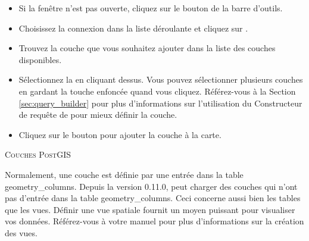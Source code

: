 \begin{itemize}[label=--]
\item Si la fenêtre  n'est pas ouverte, cliquez sur le bouton  de la barre d'outils.
\item Choisissez la connexion dans la liste déroulante et cliquez sur .
\item Trouvez la couche que vous souhaitez ajouter dans la liste des couches disponibles.
\item Sélectionnez la en cliquant dessus. Vous pouvez sélectionner plusieurs couches en gardant la touche  enfoncée quand vous cliquez. Référez-vous à la Section \ref{sec:query_builder} pour plus d'informations sur l'utilisation du Constructeur de requête de \psq pour mieux définir la couche.
\item Cliquez sur le bouton  pour ajouter la couche à la carte.
\end{itemize}

\begin{Tip}\caption{\textsc{Couches PostGIS}}
Normalement, une couche \pg est définie par une entrée dans la table geometry\_columns. Depuis la version 0.11.0, \qg peut charger des couches qui n'ont pas d'entrée dans la table geometry\_columns. Ceci concerne aussi bien les tables que les vues. Définir une vue spatiale fournit un moyen puissant pour visualiser vos données. Référez-vous à votre manuel \psq pour plus d'informations sur la création des vues.
\end{Tip}

